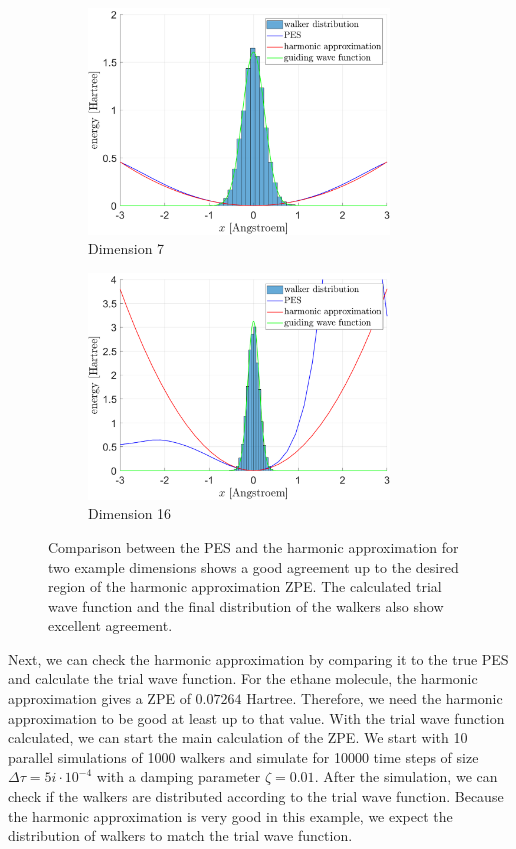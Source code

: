 \documentclass [12pt]{report}
\begin{document}
\begin{figure}[h]
\begin{subfigure}{0.5\textwidth}
\includegraphics[width=0.9\linewidth, height=6cm]{walkers1.png} 
\caption{Dimension 7}
\label{dim7}
\end{subfigure}
\begin{subfigure}{0.5\textwidth}
\includegraphics[width=0.9\linewidth, height=6cm]{walkers2.png}
\caption{Dimension 16}
\label{dim16}
\end{subfigure}
\caption{Comparison between the PES and the harmonic approximation for two example dimensions shows a good agreement up to the desired region of the harmonic approximation ZPE. The calculated trial wave function and the final distribution of the walkers also show excellent agreement.}
\label{trialwf}
\end{figure}
Next, we can check the harmonic approximation by comparing it to the true PES and calculate the trial wave function. For the ethane molecule, the harmonic approximation gives a ZPE of $0.07264$ Hartree. Therefore, we need the harmonic approximation to be good at least up to that value. With the trial wave function calculated, we can start the main calculation of the ZPE. We start with 10 parallel simulations of 1000 walkers and simulate for 10000 time steps of size $\Delta \tau = 5i \cdot 10^{-4}$ with a damping parameter $\zeta = 0.01$. After the simulation, we can check if the walkers are distributed according to the trial wave function. Because the harmonic approximation is very good in this example, we expect the distribution of walkers to match the trial wave function.
\end{document}
